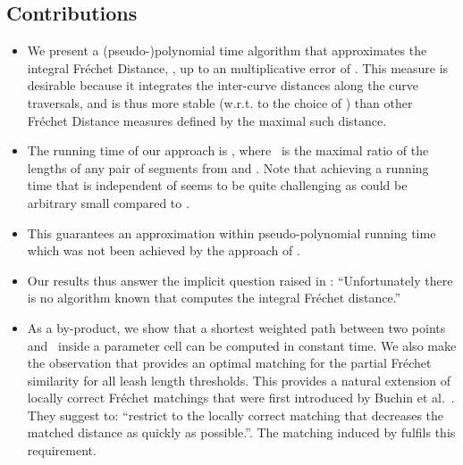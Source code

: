 \documentclass[a4paper,11pt]{article}
\begin{document}
\subsection{Contributions} 
\label{sec:our-result}
\begin{itemize}
\item
We present a (pseudo-)polynomial time algorithm that approximates the integral  Fr\'{e}chet Distance,   , up to an multiplicative error of . This measure is desirable because it integrates the inter-curve distances along the curve traversals, and is thus more stable (w.r.t. to the choice of ) than other Fr\'{e}chet Distance measures defined by the  maximal such distance.

\item
The running time of our approach is ,  where~ is the maximal ratio of the lengths of any pair of segments from  and . Note that achieving a running time that is independent of  seems to be quite challenging as  could be arbitrary small compared to . 

\item This  guarantees   an  approximation within pseudo-polynomial running time which was  not been achieved by the approach of \cite{efrat:mathching}.

\item  Our results thus answer the implicit question raised in \cite{wenk:vehicle}: ``Unfortunately there is no algorithm known that computes the integral Fr\'{e}chet distance.'' 





	
\item		As a by-product, we show that a shortest weighted path  between two points  and~ inside a parameter cell  can be computed in constant time. We also make the observation that  provides an optimal matching for the partial Fr\'{e}chet similarity for all leash length thresholds. This provides a natural extension of locally correct Fr\'{e}chet matchings that were first introduced by Buchin et al.~\cite{buchin:locally}. They suggest to: ``restrict to the locally correct matching that decreases the matched distance as quickly as possible.''\cite[p. 237]{buchin:locally}. The matching induced by  fulfils this requirement. 

\end{itemize}
	
\end{document}
